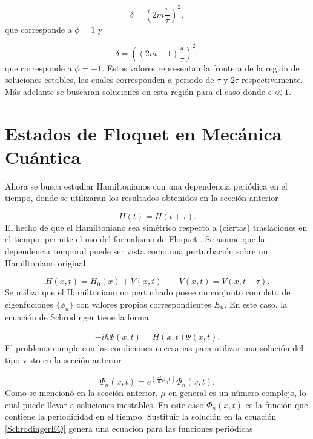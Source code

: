 \documentclass[10pt,a4paper]{report}
\begin{document}
\begin{equation}
\delta = (2m\frac{\pi}{\tau})^2, 
\end{equation} que corresponde a $\phi=1$ y

\begin{equation}
\delta = ((2m+1)\frac{\pi}{\tau})^2,
\end{equation} que corresponde a $\phi=-1$. Estos valores representan la frontera de la región de soluciones estables, las cuales corresponden a periodo de $\tau$ y $2\tau$ respectivamente. Más adelante se buscaran soluciones en esta región para el caso donde $\epsilon \ll 1$.


\section{Estados de Floquet en Mecánica Cuántica}

Ahora se busca estudiar Hamiltonianos con una dependencia periódica en el tiempo, donde se utilizaran los resultados obtenidos en la sección anterior

\begin{equation}
H(t)=H(t+\tau).
\end{equation} El hecho de que el Hamiltoniano sea simétrico respecto a (ciertas) traslaciones en el tiempo, permite el uso del formalismo de Floquet \cite{HanngiDQS}. Se asume que la dependencia temporal puede ser vista como una perturbación sobre un Hamiltoniano original

\begin{equation}
H(x,t)=H_0(x)+V(x,t) \qquad V(x,t)=V(x,t+\tau).
\end{equation} Se utiliza que el Hamiltoniano no perturbado posee un conjunto completo de eigenfuciones $\{\phi_n\}$ con valores propios correspondientes $E_n$. En este caso, la ecuación de Schr\"{o}dinger tiene la forma

\begin{equation}\label{SchrodingerEQ}
-i\hbar\dot{\Psi}(x,t) = H(x,t)\Psi(x,t).
\end{equation} El problema cumple con las condiciones necesarias para utilizar una solución del tipo visto en la sección anterior

\begin{equation}
\Psi_n(x,t) = e^{(\frac{-i}{\hbar}\mu_nt)}\Phi_n(x,t).
\end{equation} Como se mencionó en la sección anterior, $\mu$ en general es un número complejo, lo cual puede llevar a soluciones inestables. En este caso $\Phi_n(x,t)$ es la función que contiene la periodicidad en el tiempo. Sustituir la solución en la ecuación \eqref{SchrodingerEQ} genera una ecuación para las funciones periódicas
\end{document}
